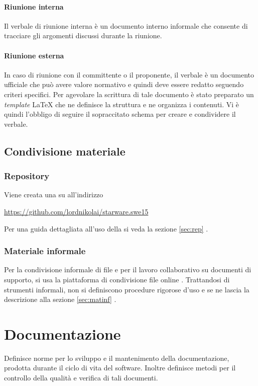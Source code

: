 \documentclass[12pt,a4paper]{article}
\begin{document}
\paragraph{Riunione interna}
Il verbale di riunione interna è un documento interno informale che consente di tracciare gli argomenti discussi durante la riunione.

\paragraph{Riunione esterna}
In caso di riunione con il committente o il proponente, il verbale è un documento ufficiale che può avere valore normativo e quindi deve essere redatto seguendo criteri specifici.
Per agevolare la scrittura di tale documento è stato preparato un \emph{template} \LaTeX{} che ne definisce la struttura e ne organizza i contenuti. Vi è quindi l'obbligo di seguire il sopraccitato schema per creare e condividere il verbale.

\subsection{Condivisione materiale}

\subsubsection{Repository}
Viene creata una  su  all'indirizzo 
\begin{center}
	\url{https://github.com/lordnikolai/starware.swe15}
\end{center}
Per una guida dettagliata all'uso della  si veda la sezione \ref{sec:rep} .

\subsubsection{Materiale informale}
Per la condivisione informale di file e per il lavoro collaborativo su documenti di supporto, si usa la piattaforma di condivisione file online . Trattandosi di strumenti informali, non si definiscono procedure rigorose d’uso e se ne lascia la descrizione alla sezione \ref{sec:matinf} .

\newpage

\section{Documentazione}
Definisce norme per lo sviluppo e il mantenimento della documentazione, prodotta durante il ciclo di vita del software. Inoltre definisce metodi per il controllo della qualità e verifica di tali documenti.
\end{document}
